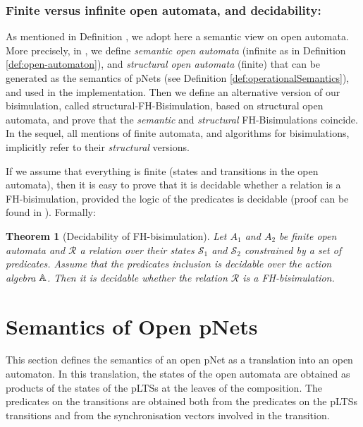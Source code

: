 \documentclass{lmcs}
\newtheorem{theorem}{Theorem}
\begin{document}
\subsubsection*{Finite versus infinite open automata, and decidability:} 
As mentioned in Definition \pageref{def:open-automaton}, we adopt here a semantic view on open automata. More precisely, in \cite{hou:hal-02406098}, we  define
\emph{semantic open automata} (infinite as in Definition \ref{def:open-automaton}),
and \emph{structural open automata} (finite) that can be generated as
the semantics of pNets (see Definition \ref{def:operationalSemantics}), and used in the implementation. Then we define
an alternative version of our bisimulation, called
structural-FH-Bisimulation, based on structural open automata, and
prove that the \emph{semantic} and \emph{structural} FH-Bisimulations coincide.
In the sequel, all mentions of finite automata, and algorithms for
bisimulations, implicitly refer to their \emph{structural} versions.

If we assume that everything is finite (states and transitions in the
open automata), then it is easy to
prove that it is decidable whether a relation is a 
FH-bisimulation, provided the logic of the predicates is
decidable (proof can be found in \cite{henrio:Forte2016}). Formally:

\begin{theorem}[Decidability of FH-bisimulation]
Let $A_1$ and $A_2$ be finite open automata
and $\mathcal{R}$ a relation over their states $\mathcal{S}_1$ and
$\mathcal{S}_2$ constrained by a set of predicates. Assume that
the predicates inclusion is decidable over  
the action algebra $\mathbb{A}$. Then it is decidable whether the relation 
$\mathcal{R}$ is a FH-bisimulation.
  
\end{theorem}



\section{Semantics of Open pNets}
\label{section:op-semantics}

This section defines the semantics of an open pNet as a translation into an open automaton. 
In this translation, the states of the open automata are obtained as products of 
the states of the pLTSs at the leaves of the composition. The
predicates on the transitions are obtained both from the predicates on
the pLTSs transitions and from the synchronisation vectors involved in
the transition. 
\end{document}
